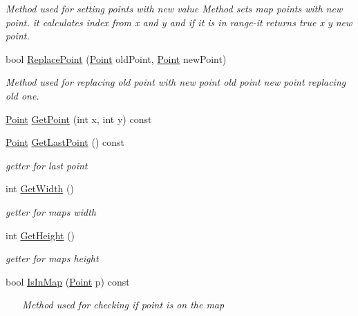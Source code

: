 \begin{DoxyCompactItemize}
\begin{DoxyCompactList}\small\item\em Method used for setting points with new value Method sets map points with new point. it calculates index from x and y and if it is in range-\/it returns true  x  y  new point. \end{DoxyCompactList}\item 
bool \mbox{\hyperlink{class_map_aacc4374e1b3984d54ecbaf9fa488d08e}{Replace\+Point}} (\mbox{\hyperlink{class_point}{Point}} old\+Point, \mbox{\hyperlink{class_point}{Point}} new\+Point)
\begin{DoxyCompactList}\small\item\em Method used for replacing old point with new point  old point  new point replacing old one. \end{DoxyCompactList}\item 
\mbox{\hyperlink{class_point}{Point}} \mbox{\hyperlink{class_map_a9f7239d47a8e426590e98b0fd07c0604}{Get\+Point}} (int x, int y) const
\item 
\mbox{\hyperlink{class_point}{Point}} \mbox{\hyperlink{class_map_aab03ac51e8468984a23f52f3ddd2cbcb}{Get\+Last\+Point}} () const
\begin{DoxyCompactList}\small\item\em getter for last point \end{DoxyCompactList}\item 
int \mbox{\hyperlink{class_map_aeca77ed7c01dec1e8effa05f0e08c266}{Get\+Width}} ()
\begin{DoxyCompactList}\small\item\em getter for map\textquotesingle{}s width \end{DoxyCompactList}\item 
int \mbox{\hyperlink{class_map_a72adf4e41e8e6558e58c2efe20445f7f}{Get\+Height}} ()
\begin{DoxyCompactList}\small\item\em getter for map\textquotesingle{}s height \end{DoxyCompactList}\item 
bool \mbox{\hyperlink{class_map_a20da42fe27ba40a81ebf25947b8a46fc}{Is\+In\+Map}} (\mbox{\hyperlink{class_point}{Point}} p) const
\begin{DoxyCompactList}\small\item\em ~\newline
~\newline
Method used for checking if point is on the map \end{DoxyCompactList}\item 

\end{DoxyCompactItemize}
